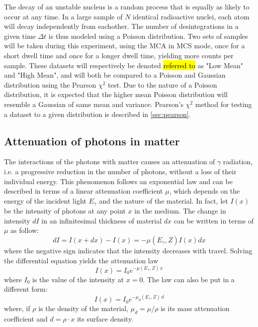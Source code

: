 The decay of an unstable nucleus is a random process that is equally as likely to occur at any time. 
In a large sample of \(N\) identical radioactive nuclei, each atom will decay independently from eachother. 
The number of desintegrations in a given time \(\Delta t\) is thus modeled 
using a Poisson distribution. Two sets of samples will be taken during this 
experiment, using the MCA in MCS mode, once for a short dwell time and once for a 
longer dwell time, yielding more counts per sample. These datasets will 
respectively be denoted \hl{referred to} as "Low Mean" and "High Mean", and will 
both be compared to a Poisson and Gaussian distribution using the Pearson 
\(\chi^2\) test. Due to the nature of a Poisson distribution, it is expected that 
the higher mean Poisson distribution will resemble a Gaussian of same mean and 
variance. Pearson's \(\chi^2\) method for testing a dataset to a given 
distribution is described in \autoref{sec:pearson}. 

\subsection{Attenuation of photons in matter}
\label{sec:attenuation}

The interactions of the photons with matter causes an attenuation of $\gamma$ radiation, i.e. a progressive reduction in the number of photons, without a loss of their individual energy.
This phenomenon follows an exponential law and can be described in terms of a linear attenuation coefficient $\mu$, which depends on the energy of the incident light $E_{\gamma}$ and the nature of the material.
In fact, let $I(x)$ be the intensity of photons at any point $x$ in the medium.
The change in intensity $dI$ in an infinitesimal thickness of material $dx$ can be written in terms of $\mu$ as follow:
\begin{equation}
    dI = I(x + dx) - I(x) = -\mu(E_{\gamma}, Z) I(x) dx
\end{equation}
where the negative sign indicates that the intensity decreases with travel.
Solving the differential equation yields the attenuation law
\begin{equation} \label{eq:attenuation_law}
    I(x) = I_0 e^{-\mu(E_{\gamma}, Z) \, x}
\end{equation}
where $I_0$ is the value of the intensity at $x=0$. 
The law can also be put in a different form:
\begin{equation} \label{eq:attenuation_law_density}
    I(x) = I_0 e^{-\mu_d(E_{\gamma}, Z) \, d}
\end{equation}
where, if $\rho$ is the density of the material, $\mu_d = \mu / \rho$ is its mass attenuation coefficient and $d = \rho \cdot x$ its surface density.

